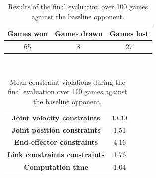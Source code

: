 \begin{table}[H]
    \centering 
    \begin{tabular}{|c | c | c |}
    \hline
     \textbf{Games won} & \textbf{Games drawn} & \textbf{Games lost} \T\B \\
    \hline \hline
    65 & 8 & 27 \T\B \\
    \hline
    \end{tabular}
    \\[10pt]
    \caption[Results of the final evaluation.]{Results of the final evaluation over 100 games against the baseline opponent.}
    \label{table:final_results}
\end{table}

\begin{table}[H]
    \centering 
    \begin{tabular}{|c | c |}
    \hline
    \textbf{Joint velocity constraints} & 13.13 \T\B \\
    \textbf{Joint position constraints} & 1.51 \T\B \\
    \textbf{End-effector constraints} & 4.16 \T\B \\
    \textbf{Link constraints constraints} & 1.76 \T\B \\
    \textbf{Computation time} & 1.04 \B \\
    
    \hline
    \end{tabular}
    \\[10pt]
    \caption[Results of the final evaluation - Mean constraint violations.]{Mean constraint violations during the final evaluation over 100 games against the baseline opponent.}
    \label{table:final_results_constraints}
\end{table}




